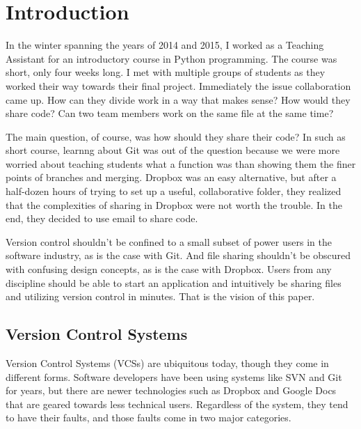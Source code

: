 \chapter{Introduction}

In the winter spanning the years of 2014 and 2015, I worked as a Teaching Assistant for an introductory course in Python programming. The course was short, only four weeks long. I met with multiple groups of students as they worked their way towards their final project. Immediately the issue collaboration came up. How can they divide work in a way that makes sense? How would they share code? Can two team members work on the same file at the same time?

The main question, of course, was how should they share their code? In such as short course, learnng about Git was out of the question because we were more worried about teaching students what a function was than showing them the finer points of branches and merging. Dropbox was an easy alternative, but after a half-dozen hours of trying to set up a useful, collaborative folder, they realized that the complexities of sharing in Dropbox were not worth the trouble. In the end, they decided to use email to share code.

Version control shouldn't be confined to a small subset of power users in the software industry, as is the case with Git. And file sharing shouldn't be obscured with confusing design concepts, as is the case with Dropbox. Users from any discipline should be able to start an application and intuitively be sharing files and utilizing version control in minutes. That is the vision of this paper.

\section{Version Control Systems}

Version Control Systems (VCSs) are ubiquitous today, though they come in different forms. Software developers have been using systems like SVN and Git for years, but there are newer technologies such as Dropbox and Google Docs that are geared towards less technical users. Regardless of the system, they tend to have their faults, and those faults come in two major categories.

